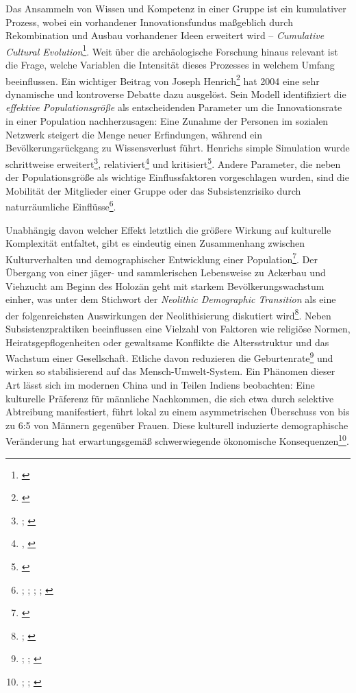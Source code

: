 \documentclass[openany,twoside,twocolumn]{book}
\let\rmarkdownfootnote\footnote%
\def\footnote{\protect\rmarkdownfootnote}
\begin{document}
Das Ansammeln von Wissen und Kompetenz in einer Gruppe ist ein kumulativer Prozess, wobei ein vorhandener Innovationsfundus maßgeblich durch Rekombination und Ausbau vorhandener Ideen erweitert wird -- \emph{Cumulative Cultural Evolution}\footnote{\textcite{mesoudi_what_2018}}. Weit über die archäologische Forschung hinaus relevant ist die Frage, welche Variablen die Intensität dieses Prozesses in welchem Umfang beeinflussen. Ein wichtiger Beitrag von Joseph Henrich\footnote{\textcite{henrich_demography_2004}} hat 2004 eine sehr dynamische und kontroverse Debatte dazu ausgelöst. Sein Modell identifiziert die \emph{effektive Populationsgröße} als entscheidenden Parameter um die Innovationsrate in einer Population nachherzusagen: Eine Zunahme der Personen im sozialen Netzwerk steigert die Menge neuer Erfindungen, während ein Bevölkerungsrückgang zu Wissensverlust führt. Henrichs simple Simulation wurde schrittweise erweitert\footnote{\textcite{KobayashiInnovativenesspopulationsize2012}; \textcite{henrich_understanding_2016}}, relativiert\footnote{\textcite{collard_population_2013}, \textcite{BaldiniRevisitingEffectPopulation2015}} und kritisiert\footnote{\textcite{vaesen_population_2016}}. Andere Parameter, die neben der Populationsgröße als wichtige Einflussfaktoren vorgeschlagen wurden, sind die Mobilität der Mitglieder einer Gruppe oder das Subsistenzrisiko durch naturräumliche Einflüsse\footnote{\textcite{collard_what_2011}; \textcite{collard_risk_2013}; \textcite{buchanan_drivers_2016}; \textcite{fitzhugh_risk_2001}; \textcite{winterhalder_risk-senstive_1999}}.

Unabhängig davon welcher Effekt letztlich die größere Wirkung auf kulturelle Komplexität entfaltet, gibt es eindeutig einen Zusammenhang zwischen Kulturverhalten und demographischer Entwicklung einer Population\footnote{\textcite{shennan_demography_2001}}. Der Übergang von einer jäger- und sammlerischen Lebensweise zu Ackerbau und Viehzucht am Beginn des Holozän geht mit starkem Bevölkerungswachstum einher, was unter dem Stichwort der \emph{Neolithic Demographic Transition} als eine der folgenreichsten Auswirkungen der Neolithisierung diskutiert wird\footnote{\textcite{bocquetappel_paleoanthropological_2002}; \textcite{gage_what_2009}}. Neben Subsistenzpraktiken beeinflussen eine Vielzahl von Faktoren wie religiöse Normen, Heiratsgepflogenheiten oder gewaltsame Konflikte die Altersstruktur und das Wachstum einer Gesellschaft. Etliche davon reduzieren die Geburtenrate\footnote{\textcite{smith_cultural_1992}; \textcite{colleran_cultural_2016}; \textcite{richerson_natural_1984}} und wirken so stabilisierend auf das Mensch-Umwelt-System. Ein Phänomen dieser Art lässt sich im modernen China und in Teilen Indiens beobachten: Eine kulturelle Präferenz für männliche Nachkommen, die sich etwa durch selektive Abtreibung manifestiert, führt lokal zu einem asymmetrischen Überschuss von bis zu 6:5 von Männern gegenüber Frauen. Diese kulturell induzierte demographische Veränderung hat erwartungsgemäß schwerwiegende ökonomische Konsequenzen\footnote{\textcite{banister_shortage_2004}; \textcite{li_cultural_2000}; \textcite{tuljapurkar_high_1995}}.
\end{document}

